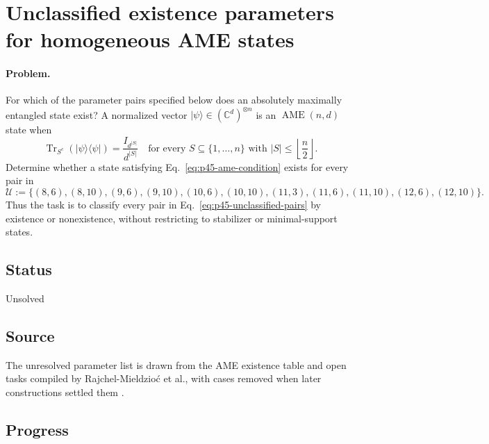 \section{Unclassified existence parameters for homogeneous AME states}
\label{sec:op_439ae5e7e9b3b043}

\paragraph{Problem.}
For which of the parameter pairs specified below does an absolutely maximally
entangled state exist?  A normalized vector
$|\psi\rangle\in(\mathbb C^d)^{\otimes n}$ is an
$\operatorname{AME}(n,d)$ state when
\begin{equation}
  \operatorname{Tr}_{S^c}\!\left(|\psi\rangle\!\langle\psi|\right)
  =\frac{I_{d^{|S|}}}{d^{|S|}}
  \quad\text{for every }S\subseteq\{1,\ldots,n\}
  \text{ with }|S|\leq\left\lfloor\frac n2\right\rfloor.
  \label{eq:p45-ame-condition}
\end{equation}
Determine whether a state satisfying Eq.~\eqref{eq:p45-ame-condition} exists
for every pair in
\begin{equation}
  \mathcal U:=\bigl\{(8,6),(8,10),(9,6),(9,10),(10,6),(10,10),
  (11,3),(11,6),(11,10),(12,6),(12,10)\bigr\}.
  \label{eq:p45-unclassified-pairs}
\end{equation}
Thus the task is to classify every pair in Eq.~\eqref{eq:p45-unclassified-pairs}
by existence or nonexistence, without restricting to stabilizer or
minimal-support states.

\subsection*{Status}

Unsolved

\subsection*{Source}

The unresolved parameter list is drawn from the AME existence table and open
tasks compiled by Rajchel-Mieldzio\'c et al., with cases removed when later
constructions settled them .

\subsection*{Progress}

